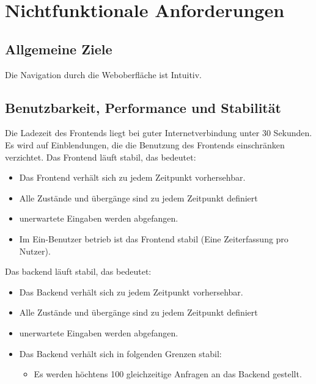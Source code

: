 \section{Nichtfunktionale Anforderungen}

\subsection{Allgemeine Ziele}
\begin{requirements}
     Die Navigation durch die Weboberfläche ist Intuitiv.
\end{requirements}

\subsection{Benutzbarkeit, Performance und Stabilität}
\begin{requirements}
     Die Ladezeit des Frontends liegt bei guter Internetverbindung unter 30 Sekunden.
     Es wird auf Einblendungen, die die Benutzung des Frontends einschränken verzichtet.
     Das Frontend läuft stabil, das bedeutet:
     \begin{itemize}
        \item Das Frontend verhält sich zu jedem Zeitpunkt vorhersehbar.
        \item Alle Zustände und übergänge sind zu jedem Zeitpunkt definiert
        \item unerwartete Eingaben werden abgefangen.
        \item Im Ein-Benutzer betrieb ist das Frontend stabil (Eine Zeiterfassung pro Nutzer).
     \end{itemize}
      Das backend läuft stabil, das bedeutet:
          \begin{itemize}
             \item Das Backend verhält sich zu jedem Zeitpunkt vorhersehbar.
             \item Alle Zustände und übergänge sind zu jedem Zeitpunkt definiert
             \item unerwartete Eingaben werden abgefangen.
             \item Das Backend verhält sich in folgenden Grenzen stabil:
                \begin{itemize}
                    \item Es werden höchtens 100 gleichzeitige Anfragen an das Backend gestellt.
                \end{itemize}
          \end{itemize}
\end{requirements}

